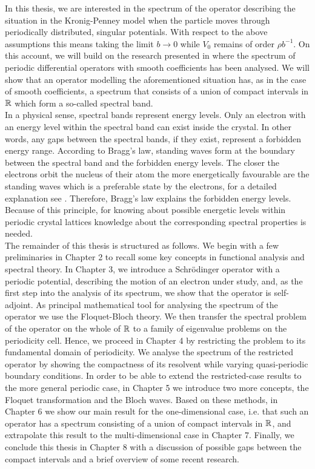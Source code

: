 In this thesis, we are interested in the spectrum of the operator describing the situation in the Kronig-Penney model when the particle moves through periodically distributed, singular potentials. With respect to the above assumptions	 this means taking the limit $b \rightarrow 0$ while $V_{0}$ remains of order $\rho b^{-1}$. On this account, we will build on the research presented in \cite{dorfler2011photonic} where the spectrum of periodic differential operators with smooth coefficients has been analysed. We will show that an operator modelling the aforementioned situation has, as in the case of smooth coefficients, a spectrum that consists of a union of compact intervals in $\mathbb{R}$ which form a so-called spectral band. 
~\\

In a physical sense, spectral bands represent energy levels. Only an electron with an energy level within the spectral band can exist inside the crystal. In other words, any gaps between the spectral bands, if they exist, represent a forbidden energy range. According to Bragg's law, standing waves form at the boundary between the spectral band and the forbidden energy levels. The closer the electrons orbit the nucleus of their atom the more energetically favourable are the standing waves which is a preferable state by the electrons, for a detailed explanation see \cite[Section 3.2]{heering2002elektrophysik}. Therefore, Bragg's law explains the forbidden energy levels. Because of this principle, for knowing about possible energetic levels within periodic crystal lattices knowledge about the corresponding spectral properties is needed.
~\\

The remainder of this thesis is structured as follows. We begin with a few preliminaries in Chapter 2 to recall some key concepts in functional analysis and spectral theory. In Chapter 3, we introduce a Schrödinger operator with a periodic potential, describing the motion of an electron under study, and, as the first step into the analysis of its spectrum, we show that the operator is self-adjoint. As principal mathematical tool for analysing the spectrum of the operator we use the Floquet-Bloch theory. We then transfer the spectral problem of the operator on the whole of $\mathbb{R}$ to a family of eigenvalue problems on the periodicity cell. Hence, we proceed in Chapter 4 by restricting the problem to its fundamental domain of periodicity. We analyse the spectrum of the restricted operator by showing the compactness of its resolvent while varying quasi-periodic boundary conditions. In order to be able to extend the restricted-case results to the more general periodic case, in Chapter 5 we introduce two more concepts, the Floquet transformation and the Bloch waves. Based on these methods, in Chapter 6 we show our main result for the one-dimensional case, i.e. that such an operator has a spectrum consisting of a union of compact intervals in $\mathbb{R}$, and extrapolate this result to the multi-dimensional case in Chapter 7. Finally, we conclude this thesis in Chapter 8 with a discussion of possible gaps between the compact intervals and a brief overview of some recent research.